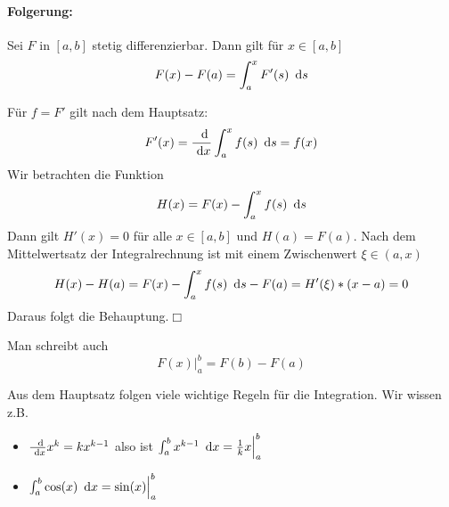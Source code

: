 \paragraph{Folgerung:}
Sei $F$ in $[a,b]$ stetig differenzierbar. Dann gilt für $x\in[a,b]$
\begin{equation*}
	F(x)-F(a)=\int_a^x F'(s)\ \operatorname{d}\! s
\end{equation*}
\begin{beweis}
	Für $f=F'$ gilt nach dem Hauptsatz:
	\begin{equation*}
		F'(x)=\frac{\ \operatorname{d}\!}{\ \operatorname{d}\! x} \int_a^x f(s)\ \operatorname{d}\! s=f(x)
	\end{equation*}
	Wir betrachten die Funktion
	\begin{equation*}
		H(x)=F(x)-\int_a^x f(s)\ \operatorname{d}\! s
	\end{equation*}
	Dann gilt $H'(x)=0$ für alle $x\in[a,b]$ und $H(a)=F(a)$. Nach dem Mittelwertsatz der Integralrechnung ist mit einem Zwischenwert $\xi\in(a,x)$
	\begin{equation*}
		H(x)-H(a)=F(x)-\int_a^x f(s)\ \operatorname{d}\! s-F(a)=H'(\xi)*(x-a)=0
	\end{equation*}
	Daraus folgt die Behauptung.\hfill$\Box$
\end{beweis}
\par
\medskip
Man schreibt auch
\begin{equation*}
	F(x)\Big|_a^b=F(b)-F(a)
\end{equation*}


Aus dem Hauptsatz folgen viele wichtige Regeln für die Integration. Wir wissen z.B.
\begin{itemize}
	\item $\frac{\ \operatorname{d}\!}{\ \operatorname{d}\! x}x^k=kx^{k-1}$ also ist $\int_a^bx^{k-1}\ \operatorname{d}\! x=\frac1kx\Big|_a^b$
	\item $\int_a^b\cos(x)\ \operatorname{d}\! x=\sin(x)\Big|_a^b$
\end{itemize}
